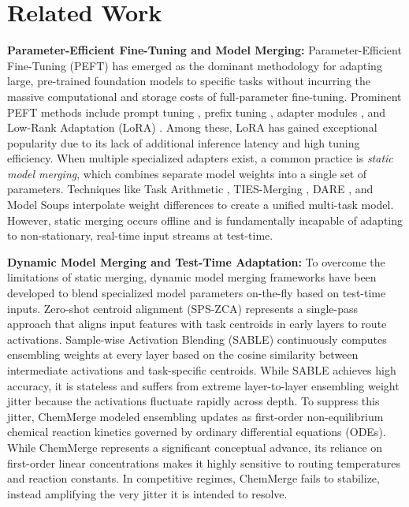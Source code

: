 \section{Related Work}
\label{sec:related}

\textbf{Parameter-Efficient Fine-Tuning and Model Merging: } Parameter-Efficient Fine-Tuning (PEFT) has emerged as the dominant methodology for adapting large, pre-trained foundation models to specific tasks without incurring the massive computational and storage costs of full-parameter fine-tuning. Prominent PEFT methods include prompt tuning \cite{lester21prompt}, prefix tuning \cite{liliang21prefix}, adapter modules \cite{houlsby19adapter}, and Low-Rank Adaptation (LoRA) \cite{hu21lora}. Among these, LoRA has gained exceptional popularity due to its lack of additional inference latency and high tuning efficiency. When multiple specialized adapters exist, a common practice is \textit{static model merging}, which combines separate model weights into a single set of parameters. Techniques like Task Arithmetic \cite{ilharco22taskarithmetic}, TIES-Merging \cite{yadav23ties}, DARE \cite{yu23dare}, and Model Soups \cite{wortsman22soups} interpolate weight differences to create a unified multi-task model. However, static merging occurs offline and is fundamentally incapable of adapting to non-stationary, real-time input streams at test-time.

\textbf{Dynamic Model Merging and Test-Time Adaptation: } To overcome the limitations of static merging, dynamic model merging frameworks have been developed to blend specialized model parameters on-the-fly based on test-time inputs. Zero-shot centroid alignment (SPS-ZCA) \cite{zhang24spszca} represents a single-pass approach that aligns input features with task centroids in early layers to route activations. Sample-wise Activation Blending (SABLE) \cite{liang23sable} continuously computes ensembling weights at every layer based on the cosine similarity between intermediate activations and task-specific centroids. While SABLE achieves high accuracy, it is stateless and suffers from extreme layer-to-layer ensembling weight jitter because the activations fluctuate rapidly across depth. To suppress this jitter, ChemMerge modeled ensembling updates as first-order non-equilibrium chemical reaction kinetics governed by ordinary differential equations (ODEs). While ChemMerge represents a significant conceptual advance, its reliance on first-order linear concentrations makes it highly sensitive to routing temperatures and reaction constants. In competitive regimes, ChemMerge fails to stabilize, instead amplifying the very jitter it is intended to resolve.

